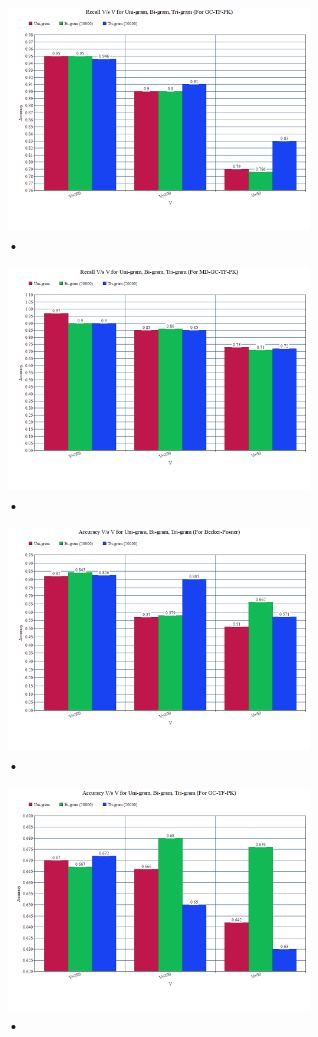 \documentclass[letterpaper]{article}
\begin{document}
\begin{figure}
\caption{•}
\includegraphics[width=8cm]{2.png}
\end{figure}
\begin{figure}
\caption{•}
\includegraphics[width=8cm]{3.png}
\end{figure}
\begin{figure}
\caption{•}
\includegraphics[width=8cm]{4.png}
\end{figure}
\begin{figure}
\caption{•}
\includegraphics[width=8cm]{5.png}
\end{figure}
\end{document}

